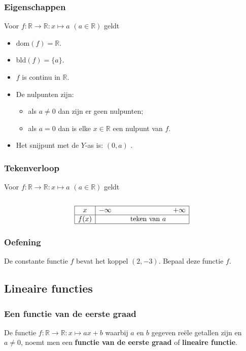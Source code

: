 \begin{frame}
\frametitle{Eigenschappen}
\pause
\begin{eigenschap}
Voor $f:\mathbb{R}\rightarrow \mathbb{R}:x\mapsto a$ $(a \in \mathbb{R})$ geldt
\begin{itemize}
\item dom$(f)=\mathbb{R}$.
\item bld$(f)=\{a\}$.
\item $f$ is continu in $\mathbb{R}$.
\item De nulpunten zijn:
      \begin{itemize}
      \item als $a\neq 0$ dan zijn er geen nulpunten;
      \item als $a=0$ dan is elke $x\in \mathbb{R}$ een nulpunt van $f$.
      \end{itemize}
\item Het snijpunt met de $Y$-as is:
      $(0,a)$ .
\end{itemize}
\end{eigenschap}
\end{frame}

\begin{frame}
\frametitle{Tekenverloop}
\pause
Voor $f:\mathbb{R}\rightarrow \mathbb{R}:x\mapsto a$ $(a \in \mathbb{R})$ geldt
\\~\\
\[\begin{array}{|c|lcr|}
  \hline
  x&-\infty ~~~~~ & ~~~ & +\infty\\
  \hline
  f(x)& & \mbox{teken van }a &\\
  \hline
  \end{array}\]
\end{frame}

\begin{frame}
\frametitle{Oefening}
De constante functie $f$ bevat het koppel $(2,-3)$. Bepaal deze functie $f$.\\
\end{frame}

\subsection{Lineaire functies}
\begin{frame}
\frametitle{Een functie van de eerste graad}
\pause
\begin{definitie}
De functie $f:\mathbb{R}\rightarrow \mathbb{R}:x\mapsto ax+b$ waarbij $a$ en $b$ gegeven re\"ele getallen zijn en $a\neq 0$, noemt men een {\bfseries functie van de eerste graad} of {\bfseries lineaire functie}.
\end{definitie}
\end{frame}

